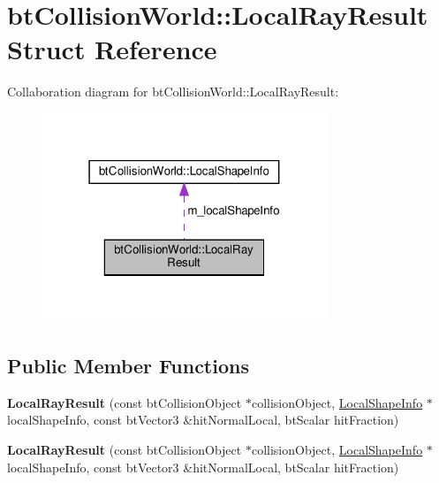 \hypertarget{structbtCollisionWorld_1_1LocalRayResult}{}\section{bt\+Collision\+World\+:\+:Local\+Ray\+Result Struct Reference}
\label{structbtCollisionWorld_1_1LocalRayResult}


Collaboration diagram for bt\+Collision\+World\+:\+:Local\+Ray\+Result\+:
\nopagebreak
\begin{figure}[H]
\begin{center}
\leavevmode
\includegraphics[width=243pt]{structbtCollisionWorld_1_1LocalRayResult__coll__graph}
\end{center}
\end{figure}
\subsection*{Public Member Functions}
\begin{DoxyCompactItemize}
\item 
\mbox{\label{structbtCollisionWorld_1_1LocalRayResult_aaa67cba647d03ce66c5feb8d3ba74c12}} 
{\bfseries Local\+Ray\+Result} (const bt\+Collision\+Object $\ast$collision\+Object, \hyperlink{structbtCollisionWorld_1_1LocalShapeInfo}{Local\+Shape\+Info} $\ast$local\+Shape\+Info, const bt\+Vector3 \&hit\+Normal\+Local, bt\+Scalar hit\+Fraction)
\item 
\mbox{\label{structbtCollisionWorld_1_1LocalRayResult_aaa67cba647d03ce66c5feb8d3ba74c12}} 
{\bfseries Local\+Ray\+Result} (const bt\+Collision\+Object $\ast$collision\+Object, \hyperlink{structbtCollisionWorld_1_1LocalShapeInfo}{Local\+Shape\+Info} $\ast$local\+Shape\+Info, const bt\+Vector3 \&hit\+Normal\+Local, bt\+Scalar hit\+Fraction)
\end{DoxyCompactItemize}

